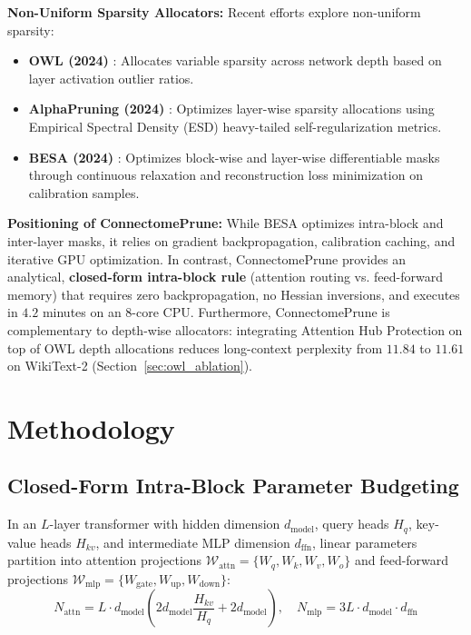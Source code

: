 \documentclass{article}
\begin{document}
\textbf{Non-Uniform Sparsity Allocators:} Recent efforts explore non-uniform sparsity:
\begin{itemize}
    \item \textbf{OWL (2024)} \cite{yin2024owl}: Allocates variable sparsity across network depth based on layer activation outlier ratios.
    \item \textbf{AlphaPruning (2024)} \cite{alphapruning2024}: Optimizes layer-wise sparsity allocations using Empirical Spectral Density (ESD) heavy-tailed self-regularization metrics.
    \item \textbf{BESA (2024)} \cite{besa2024}: Optimizes block-wise and layer-wise differentiable masks through continuous relaxation and reconstruction loss minimization on calibration samples.
\end{itemize}

\textbf{Positioning of ConnectomePrune:} While BESA optimizes intra-block and inter-layer masks, it relies on gradient backpropagation, calibration caching, and iterative GPU optimization. In contrast, ConnectomePrune provides an analytical, \textbf{closed-form intra-block rule} (attention routing vs. feed-forward memory) that requires zero backpropagation, no Hessian inversions, and executes in $4.2$ minutes on an 8-core CPU. Furthermore, ConnectomePrune is complementary to depth-wise allocators: integrating Attention Hub Protection on top of OWL depth allocations reduces long-context perplexity from $11.84$ to $11.61$ on WikiText-2 (Section~\ref{sec:owl_ablation}).

\section{Methodology}

\subsection{Closed-Form Intra-Block Parameter Budgeting}
In an $L$-layer transformer with hidden dimension $d_{\text{model}}$, query heads $H_q$, key-value heads $H_{kv}$, and intermediate MLP dimension $d_{\text{ffn}}$, linear parameters partition into attention projections $\mathcal{W}_{\text{attn}} = \{W_q, W_k, W_v, W_o\}$ and feed-forward projections $\mathcal{W}_{\text{mlp}} = \{W_{\text{gate}}, W_{\text{up}}, W_{\text{down}}\}$:
\begin{equation}
N_{\text{attn}} = L \cdot d_{\text{model}} \left( 2 d_{\text{model}} \frac{H_{kv}}{H_q} + 2 d_{\text{model}} \right), \quad N_{\text{mlp}} = 3 L \cdot d_{\text{model}} \cdot d_{\text{ffn}}
\end{equation}
\end{document}
